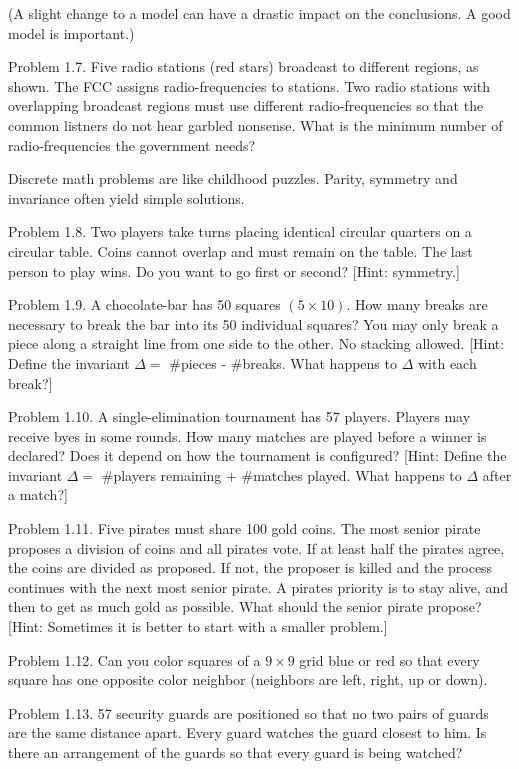 \documentclass[10pt]{article}
\begin{document}
(A slight change to a model can have a drastic impact on the conclusions. A good model is important.)

Problem 1.7. Five radio stations (red stars) broadcast to different regions, as shown. The FCC assigns radio-frequencies to stations. Two radio stations with overlapping broadcast regions must use different radio-frequencies so that the common listners do not hear garbled nonsense. What is the minimum number of radio-frequencies the government needs?

Discrete math problems are like childhood puzzles. Parity, symmetry and invariance often yield simple solutions.


Problem 1.8. Two players take turns placing identical circular quarters on a circular table. Coins cannot overlap and must remain on the table. The last person to play wins. Do you want to go first or second? [Hint: symmetry.]

Problem 1.9. A chocolate-bar has 50 squares $(5 \times 10)$. How many breaks are necessary to break the bar into its 50 individual squares? You may only break a piece along a straight line from one side to the other. No stacking allowed. [Hint: Define the invariant $\Delta=$ \#pieces - \#breaks. What happens to $\Delta$ with each break?]


Problem 1.10. A single-elimination tournament has 57 players. Players may receive byes in some rounds. How many matches are played before a winner is declared? Does it depend on how the tournament is configured? [Hint: Define the invariant $\Delta=$ \#players remaining + \#matches played. What happens to $\Delta$ after a match?]

Problem 1.11. Five pirates must share 100 gold coins. The most senior pirate proposes a division of coins and all pirates vote. If at least half the pirates agree, the coins are divided as proposed. If not, the proposer is killed and the process continues with the next most senior pirate. A pirates priority is to stay alive, and then to get as much gold as possible. What should the senior pirate propose? [Hint: Sometimes it is better to start with a smaller problem.]

Problem 1.12. Can you color squares of a $9 \times 9$ grid blue or red so that every square has one opposite color neighbor (neighbors are left, right, up or down).

Problem 1.13. 57 security guards are positioned so that no two pairs of guards are the same distance apart. Every guard watches the guard closest to him. Is there an arrangement of the guards so that every guard is being watched?
\end{document}
